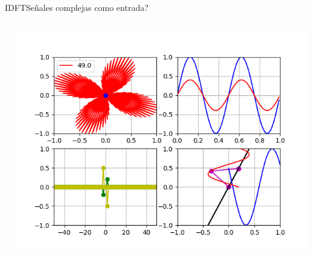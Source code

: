 \begin{frame}{IDFT}{Señales complejas como entrada?}
   \handsonicon
   \begin{columns}[c]
      \hspace{2pt}
      \begin{column}{.5\textwidth}
         
      \end{column}
      \hspace{2pt}
      \vrule
      \hspace{2pt}
      \begin{column}{.4\textwidth}
         \centering\includegraphics[width=1.0\textwidth]{4_clase/euler7}
      \end{column}
      \hspace{2pt}
   \end{columns}
   \vfill
\end{frame}
